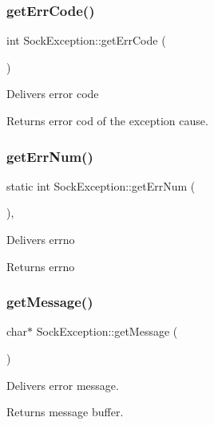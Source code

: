 \subsubsection{\texorpdfstring{get\+Err\+Code()}{getErrCode()}}
{\footnotesize\ttfamily int Sock\+Exception\+::get\+Err\+Code (\begin{DoxyParamCaption}{ }\end{DoxyParamCaption})\hspace{0.3cm}{\ttfamily [inline]}}

Delivers error code \begin{DoxyReturn}{Returns}
error cod of the exception cause. 
\end{DoxyReturn}
\mbox{\label{classSockException_a2539deadacaa23d71da34028d3f2ebc6}} 
\subsubsection{\texorpdfstring{get\+Err\+Num()}{getErrNum()}}
{\footnotesize\ttfamily static int Sock\+Exception\+::get\+Err\+Num (\begin{DoxyParamCaption}{ }\end{DoxyParamCaption})\hspace{0.3cm}{\ttfamily [inline]}, {\ttfamily [static]}}

Delivers errno \begin{DoxyReturn}{Returns}
errno 
\end{DoxyReturn}
\mbox{\label{classSockException_a198639b7111afd33d453e8bca22a7784}} 
\subsubsection{\texorpdfstring{get\+Message()}{getMessage()}}
{\footnotesize\ttfamily char$\ast$ Sock\+Exception\+::get\+Message (\begin{DoxyParamCaption}{ }\end{DoxyParamCaption})\hspace{0.3cm}{\ttfamily [inline]}}

Delivers error message. \begin{DoxyReturn}{Returns}
message buffer. 
\end{DoxyReturn}
\mbox{\label{classSockException_aa11513eff91eeed1cc5d098951700823}} 
